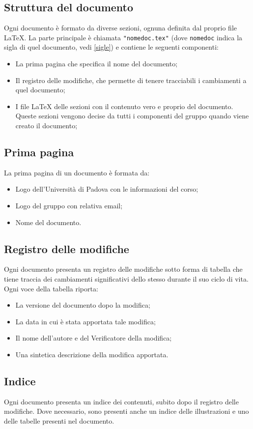 \subsection{Struttura del documento}
Ogni documento è formato da diverse sezioni, ognuna definita dal proprio file LaTeX. La parte principale è chiamata \texttt{"nomedoc.tex"} (dove \texttt{nomedoc} indica la sigla di quel documento, vedi \ref{sigle}) e contiene le seguenti componenti:
\begin{itemize}
    \item La prima pagina che specifica il nome del documento;
    \item Il registro delle modifiche, che permette di tenere tracciabili i cambiamenti a quel documento;
    \item I file LaTeX delle sezioni con il contenuto vero e proprio del documento. Queste sezioni vengono decise da tutti i componenti del gruppo quando viene creato il documento;
\end{itemize}
\subsection{Prima pagina}
La prima pagina di un documento è formata da:
\begin{itemize}
    \item Logo dell'Università di Padova con le informazioni del corso;
    \item Logo del gruppo con relativa email;
    \item Nome del documento.
\end{itemize}
\subsection{Registro delle modifiche}
Ogni documento presenta un registro delle modifiche sotto forma di tabella che tiene traccia dei cambiamenti significativi dello stesso durante il suo ciclo di vita. Ogni voce della tabella riporta:
\begin{itemize}
    \item La versione del documento dopo la modifica;
    \item La data in cui è stata apportata tale modifica;
    \item Il nome dell'autore e del Verificatore della modifica;
    \item Una sintetica descrizione della modifica apportata.
\end{itemize}
\subsection{Indice}
Ogni documento presenta un indice dei contenuti, subito dopo il registro delle modifiche. Dove necessario, sono presenti anche un indice delle illustrazioni e uno delle tabelle presenti nel documento.
